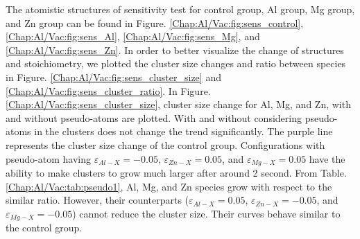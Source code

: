 The atomistic structures of sensitivity test for control group, Al group, Mg group, and Zn group can be found in Figure. \ref{Chap:Al/Vac:fig:sens_control}, \ref{Chap:Al/Vac:fig:sens_Al}, \ref{Chap:Al/Vac:fig:sens_Mg}, and \ref{Chap:Al/Vac:fig:sens_Zn}. In order to better visualize the change of structures and stoichiometry, we plotted the cluster size changes and ratio between species in Figure. \ref{Chap:Al/Vac:fig:sens_cluster_size} and \ref{Chap:Al/Vac:fig:sens_cluster_ratio}. In Figure. \ref{Chap:Al/Vac:fig:sens_cluster_size}, cluster size change for Al, Mg, and Zn, with and without pseudo-atoms are plotted. With and without considering pseudo-atoms in the clusters does not change the trend significantly. The purple line represents the cluster size change of the control group. Configurations with pseudo-atom having  $\varepsilon_{Al-X} = -0.05$, $\varepsilon_{Zn-X} = 0.05$, and $\varepsilon_{Mg-X} = 0.05$ have the ability to make clusters to grow much larger after around 2 second.  From Table. \ref{Chap:Al/Vac:tab:pseudo1}, Al, Mg, and Zn species grow with respect to the similar ratio. However, their counterparts ($\varepsilon_{Al-X} = 0.05$, $\varepsilon_{Zn-X} = -0.05$, and $\varepsilon_{Mg-X} = -0.05$) cannot reduce the cluster size. Their curves behave similar to the control group.


